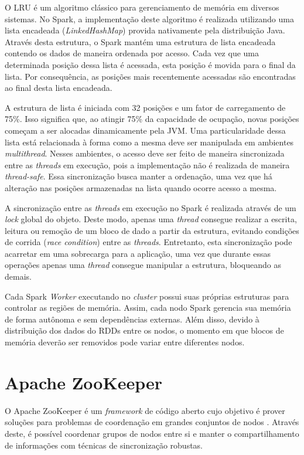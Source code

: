O LRU é um algoritmo clássico para gerenciamento de memória em diversos sistemas. No Spark, a implementação deste algoritmo é realizada utilizando uma lista encadeada (\textit{LinkedHashMap}) provida nativamente pela distribuição Java. Através desta estrutura, o Spark mantém uma estrutura de lista encadeada contendo os dados de maneira ordenada por acesso. Cada vez que uma determinada posição dessa lista é acessada, esta posição é movida para o final da lista. Por consequência, as posições mais recentemente acessadas são encontradas ao final desta lista encadeada.

A estrutura de lista é iniciada com 32 posições e um fator de carregamento de 75\%. Isso significa que, ao atingir 75\% da capacidade de ocupação, novas posições começam a ser alocadas dinamicamente pela JVM. Uma particularidade dessa lista está relacionada à forma como a mesma deve ser manipulada em ambientes \textit{multithread}. Nesses ambientes, o acesso deve ser feito de maneira sincronizada entre as \textit{threads} em execução, pois a implementação não é realizada de maneira \textit{thread-safe}. Essa sincronização busca manter a ordenação, uma vez que há alteração nas posições armazenadas na lista quando ocorre acesso a mesma.

A sincronização entre as \textit{threads} em execução no Spark é realizada através de um \textit{lock} global do objeto. Deste modo, apenas uma \textit{thread} consegue realizar a escrita, leitura ou remoção de um bloco de dado a partir da estrutura, evitando condições de corrida (\textit{race condition}) entre as \textit{threads}. Entretanto, esta sincronização pode acarretar em uma sobrecarga para a aplicação, uma vez que durante essas operações apenas uma \textit{thread} consegue manipular a estrutura, bloqueando as demais.

Cada Spark \textit{Worker} executando no \textit{cluster} possui suas próprias estruturas para controlar as regiões de memória. Assim, cada nodo Spark gerencia sua memória de forma autônoma e sem dependências externas. Além disso, devido à distribuição dos dados do RDDs entre os nodos, o momento em que blocos de memória deverão ser removidos pode variar entre diferentes nodos. 

\section{Apache ZooKeeper} \label{sec:Zookeeper}
O Apache ZooKeeper é um \textit{framework} de código aberto cujo objetivo é prover soluções para problemas de coordenação em grandes conjuntos de nodos \cite{hunt2010Zookeeper}. Através deste, é possível coordenar grupos de nodos entre si e manter o compartilhamento de informações com técnicas de sincronização robustas.

